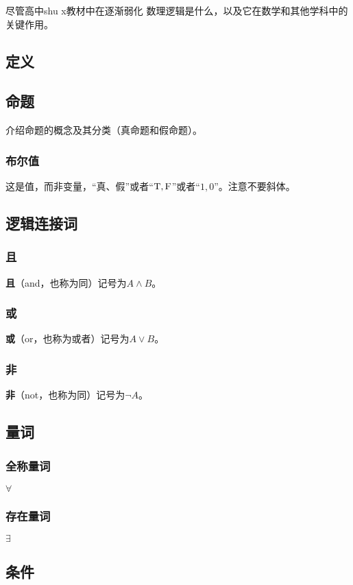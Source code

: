 
\begin{issues}
\issueDraft
\end{issues}

尽管高中shu x教材中在逐渐弱化
数理逻辑是什么，以及它在数学和其他学科中的关键作用。

\subsection{定义}

\subsection{命题}
介绍命题的概念及其分类（真命题和假命题）。
\subsubsection{布尔值}
这是值，而非变量，“真、假”或者“${\rm T,F}$”或者“$1,0$”。注意不要斜体。
\subsection{逻辑连接词}
\subsubsection{且}
\textbf{且}（and，也称为同）记号为$A\land B$。
\subsubsection{或}
\textbf{或}（or，也称为或者）记号为$A\lor B$。


\subsubsection{非}
\textbf{非}（not，也称为同）记号为$\lnot A$。
\subsection{量词}
\subsubsection{全称量词}
$\forall$
\subsubsection{存在量词}
$\exists$

\subsection{条件}